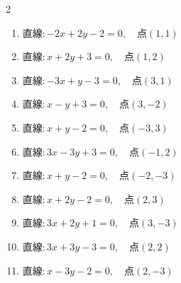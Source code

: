 \begin{multicols}{2}
\begin{enumerate}

  \item $直線:-2x+2y-2=0,\quad 点 ( 1, 1 )$


  \item $直線:x+2y+3=0,\quad 点 ( 1, 2 )$


  \item $直線:-3x+y-3=0,\quad 点 ( 3, 1 )$


  \item $直線:x-y+3=0,\quad 点 ( 3, -2 )$


  \item $直線:x+y-2=0,\quad 点 ( -3, 3 )$


  \item $直線:3x-3y+3=0,\quad 点 ( -1, 2 )$


\columnbreak %

\resetques

  \item $直線:x+y-2=0,\quad 点 ( -2, -3 )$


  \item $直線:x+2y-2=0,\quad 点 ( 2, 3 )$


  \item $直線:3x+2y+1=0,\quad 点 ( 3, -3 )$


  \item $直線:3x+3y-3=0,\quad 点 ( 2, 2 )$


  \item $直線:x-3y-2=0,\quad 点 ( 2, -3 )$



\end{enumerate}
\end{multicols}
